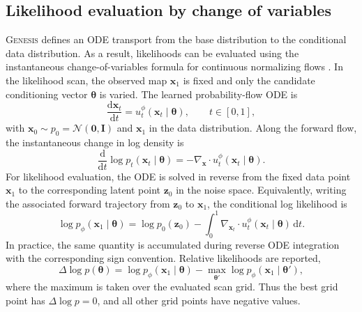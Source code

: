 \documentclass[usenatbib]{mnras}
\newcommand{\thetavec}{\boldsymbol{\theta}}
\begin{document}
\subsection{Likelihood evaluation by change of variables}
\label{sec:likelihood_change}

\textsc{Genesis} defines an ODE transport from the base distribution to
the conditional data distribution. As a result, likelihoods can be
evaluated using the instantaneous change-of-variables formula for
continuous normalizing flows \citep{Chen2018}. In the likelihood scan,
the observed map $\mathbf{x}_1$ is fixed and only the candidate
conditioning vector $\thetavec$ is varied. The learned probability-flow
ODE is
\begin{equation}
  \frac{\mathrm{d}\mathbf{x}_t}{\mathrm{d}t}
  =
  u_t^\phi(\mathbf{x}_t\mid\thetavec),
  \qquad t\in[0,1],
  \label{eq:likelihood_pfode}
\end{equation}
with $\mathbf{x}_0\sim p_0=\mathcal{N}(\mathbf{0},\mathbf{I})$ and
$\mathbf{x}_1$ in the data distribution. Along the forward flow, the
instantaneous change in log density is
\begin{equation}
  \frac{\mathrm{d}}{\mathrm{d}t}
  \log p_t(\mathbf{x}_t\mid\thetavec)
  =
  -
  \nabla_{\mathbf{x}}\!\cdot
  u_t^\phi(\mathbf{x}_t\mid\thetavec).
  \label{eq:instantaneous_change}
\end{equation}
For likelihood evaluation, the ODE is solved in reverse from the fixed
data point $\mathbf{x}_1$ to the corresponding latent point
$\mathbf{z}_0$ in the noise space. Equivalently, writing the associated
forward trajectory from $\mathbf{z}_0$ to $\mathbf{x}_1$, the conditional
log likelihood is
\begin{equation}
  \log p_\phi(\mathbf{x}_1\mid\thetavec)
  =
  \log p_0(\mathbf{z}_0)
  -
  \int_0^1
  \nabla_{\mathbf{x}_t}\!\cdot
  u_t^\phi(\mathbf{x}_t\mid\thetavec)
  \,\mathrm{d}t .
  \label{eq:cnf_likelihood}
\end{equation}
In practice, the same quantity is accumulated during reverse ODE
integration with the corresponding sign convention.
Relative likelihoods are reported,
\begin{equation}
  \Delta\log p(\thetavec)
  =
  \log p_\phi(\mathbf{x}_1\mid\thetavec)
  -
  \max_{\thetavec'}
  \log p_\phi(\mathbf{x}_1\mid\thetavec'),
  \label{eq:dlogp_scan}
\end{equation}
where the maximum is taken over the evaluated scan grid. Thus the
best grid point has $\Delta\log p=0$, and all other grid points have
negative values.
\end{document}
